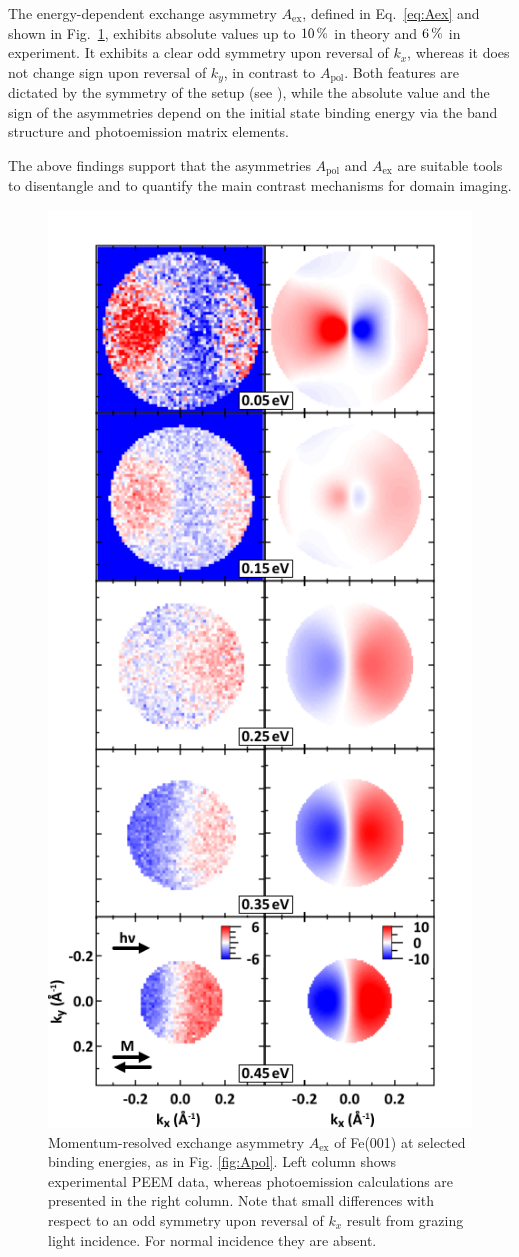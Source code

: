 \documentclass[prl,twocolumn,floatfix]{revtex4-2}
\begin{document}
The energy-dependent exchange asymmetry $A_{\mathrm{ex}}$, defined in Eq.~\eqref{eq:Aex} and shown in Fig.~\ref{fig:Aex}, exhibits absolute values up to $\unit[10]{\%}$ in theory and $\unit[6]{\%}$ in experiment. It exhibits a clear odd symmetry upon reversal of $k_{x}$, whereas it does not change sign upon reversal of $k_{y}$, in contrast to $A_{\mathrm{pol}}$. Both features are dictated by the symmetry of the setup (see \cite{Supplement}), while the absolute value and the sign of the asymmetries depend on the initial state binding energy via the band structure and photoemission matrix elements.

The above findings support that the asymmetries $A_{\mathrm{pol}}$ and $A_{\mathrm{ex}}$ are suitable tools to disentangle and to quantify the main contrast mechanisms for domain imaging. 
\begin{figure}
    \centering
    \includegraphics[width = 0.7\columnwidth]{FePaperAex.pdf}
    \caption{Momentum-resolved exchange asymmetry $A_{\mathrm{ex}}$ of Fe(001) at selected binding energies, as in Fig. \ref{fig:Apol}. Left column shows experimental PEEM data, whereas photoemission calculations are presented in the right column. Note that small differences with respect to an odd symmetry upon reversal of $k_{x}$ result from grazing light incidence. For normal incidence they are absent.}
    \label{fig:Aex}
\end{figure}
\end{document}
